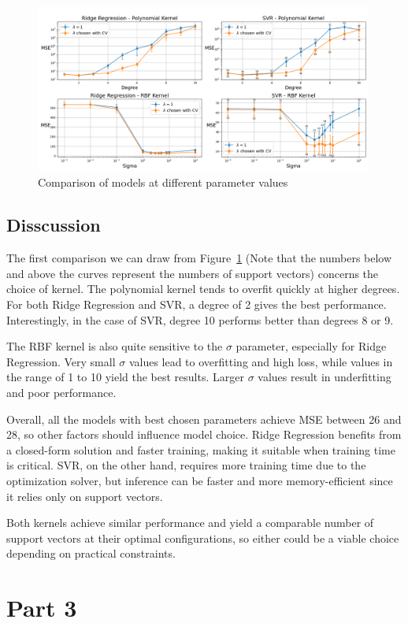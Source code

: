 \documentclass[9pt]{IEEEtran}
\begin{document}
\vspace{30pt}
\begin{figure}[H]
    \centering
    \includegraphics[width=0.99\textwidth]{figures/part2.png}
    \caption{Comparison of models at different parameter values}
    \label{fig:part2}
\end{figure}


\newpage
\subsection{Disscussion}
The first comparison we can draw from Figure~\ref{fig:part2} (Note that the numbers 
below and above the curves represent the numbers of support vectors) concerns 
the choice of kernel. The polynomial kernel tends to overfit quickly
 at higher degrees. For both Ridge Regression and SVR, a degree of 2
  gives the best performance. Interestingly, in the case of SVR, degree 
  10 performs better than degrees 8 or 9.  

The RBF kernel is also quite sensitive to the \(\sigma\) parameter, 
especially for Ridge Regression. Very small \(\sigma\) values lead to 
overfitting and high loss, while values in the range of 1 to 10 yield
 the best results. Larger \(\sigma\) values result in underfitting and 
 poor performance.

Overall, all the models with best chosen parameters
 achieve MSE between 26 and 28, so other factors 
should influence model choice. Ridge Regression benefits from a closed-form 
solution and faster training, making it suitable when training time is 
critical. SVR, on the other hand, requires more training time due to the
 optimization solver, but inference can be faster and more memory-efficient 
 since it relies only on support vectors.

Both kernels achieve similar performance and yield a comparable number 
of support vectors at their optimal configurations, so either could be a
 viable choice depending on practical constraints.

 \newpage
\section{Part 3}





\end{document}
